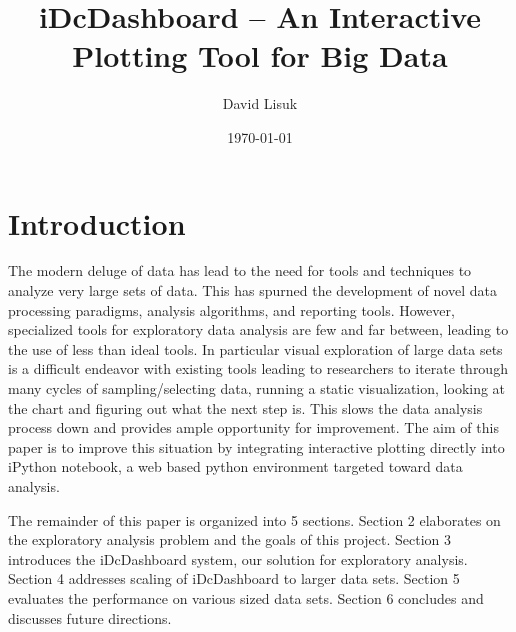 \documentclass[letter,twocolumn]{article}
\title{iDcDashboard -- An Interactive Plotting Tool for Big Data}
\author{David Lisuk}
\date{\today}
\begin{document}


\section{Introduction}%

The modern deluge of data has lead to the need for tools and techniques to analyze very large sets of data.
This has spurned the development of novel data processing paradigms\cite{dean2008mapreduce}\cite{zaharia2010spark}, analysis algorithms, and reporting tools.
However, specialized tools for exploratory data analysis are few and far between, leading to the use of less than ideal tools.
In particular visual exploration of large data sets is a difficult endeavor with existing tools leading to researchers to iterate through many cycles of sampling/selecting data, running a static visualization, looking at the chart and figuring out what the next step is.
This slows the data analysis process down and provides ample opportunity for improvement.
The aim of this paper is to improve this situation by integrating interactive plotting directly into iPython notebook\cite{perez2013open}, a web based python environment targeted toward data analysis.

The remainder of this paper is organized into 5 sections.
Section 2 elaborates on the exploratory analysis problem and the goals of this project.
Section 3 introduces the iDcDashboard system, our solution for exploratory analysis.
Section 4 addresses scaling of iDcDashboard to larger data sets.
Section 5 evaluates the performance on various sized data sets.
Section 6 concludes and discusses future directions.
\end{document}
